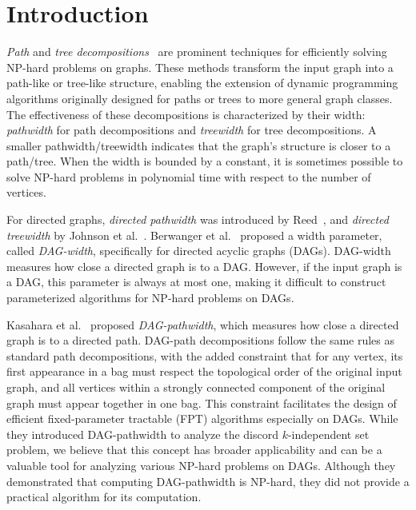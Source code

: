 \documentclass[runningheads]{llncs}
\theoremstyle{plain}
\theoremstyle{definition}
\begin{document}
\section{Introduction}

\emph{Path} and \emph{tree decompositions}~\cite{art1,art2} are prominent techniques for efficiently solving NP-hard problems on graphs. These methods transform the input graph into a path-like or tree-like structure, enabling the extension of dynamic programming algorithms originally designed for paths or trees to more general graph classes. The effectiveness of these decompositions is characterized by their width: \emph{pathwidth} for path decompositions and \emph{treewidth} for tree decompositions. A smaller pathwidth/treewidth indicates that the graph's structure is closer to a path/tree. When the width is bounded by a constant, it is sometimes possible to solve NP-hard problems in polynomial time with respect to the number of vertices.

For directed graphs, \emph{directed pathwidth} was introduced by Reed~\cite{art9}, and \emph{directed treewidth} by Johnson et al.~\cite{art10}. Berwanger et al.~\cite{art11} proposed a width parameter, called \emph{DAG-width}, specifically for directed acyclic graphs (DAGs). DAG-width measures how close a directed graph is to a DAG. However, if the input graph is a DAG, this parameter is always at most one, making it difficult to construct parameterized algorithms for NP-hard problems on DAGs.


Kasahara et al.~\cite{art12} proposed \emph{DAG-pathwidth}, which measures how close a directed graph is to a directed path. DAG-path decompositions follow the same rules as standard path decompositions, with the added constraint that for any vertex, its first appearance in a bag must respect the topological order of the original input graph, and all vertices within a strongly connected component of the original graph must appear together in one bag. This constraint facilitates the design of efficient fixed-parameter tractable (FPT) algorithms especially on DAGs. While they introduced DAG-pathwidth to analyze the discord $k$-independent set problem, we believe that this concept has broader applicability and can be a valuable tool for analyzing various NP-hard problems on DAGs. Although they demonstrated that computing DAG-pathwidth is NP-hard, they did not provide a practical algorithm for its computation.
\end{document}
